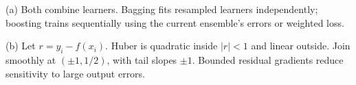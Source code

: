 (a) Both combine learners. Bagging fits resampled learners independently; boosting trains sequentially using the current ensemble's errors or weighted loss.


(b) Let \(r=y_i-f(x_i)\). Huber is quadratic inside \(|r|<1\) and linear outside. Join smoothly at \((\pm1,1/2)\), with tail slopes \(\pm1\). Bounded residual gradients reduce sensitivity to large output errors.

